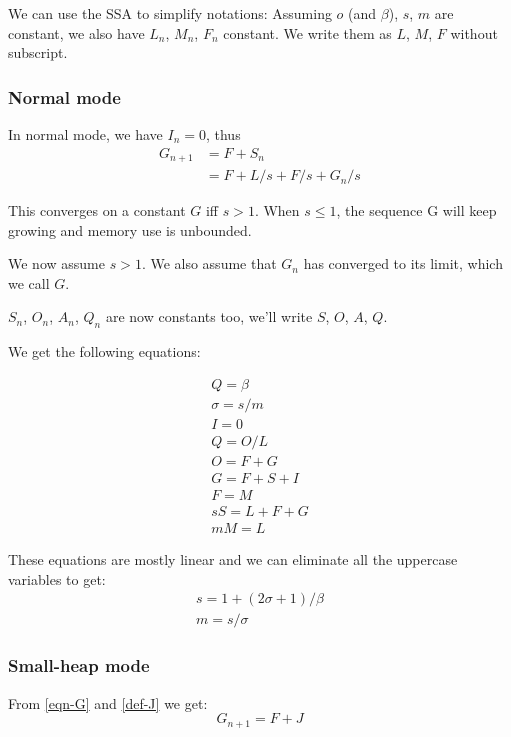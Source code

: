 \documentclass{article}
\begin{document}
We can use the SSA to simplify notations: Assuming $o$ (and $\beta$),
$s$, $m$ are constant, we also have $L_n$, $M_n$, $F_n$ constant. We
write them as $L$, $M$, $F$ without subscript.

\subsubsection{Normal mode}

In normal mode, we have $I_n = 0$, thus
\begin{equation}
\begin{split}
G_{n+1} & = F + S_n \\
        & = F + L/s + F/s + G_n/s
\end{split}
\end{equation}

This converges on a constant $G$ iff $s > 1$. When $s \leq 1$, the
sequence G will keep growing and memory use is unbounded.

We now assume $s > 1$. We also assume that $G_n$ has converged to its
limit, which we call $G$.

$S_n$, $O_n$, $A_n$, $Q_n$ are now constants too, we'll write $S$,
$O$, $A$, $Q$.

We get the following equations:

\begin{gather*}
Q = \beta      \\
\sigma = s/m   \\
I = 0          \\
Q = O / L      \\
O = F + G      \\
G = F + S + I  \\
F = M          \\
sS = L + F + G \\
mM = L
\end{gather*}

These equations are mostly linear and we can eliminate all the
uppercase variables to get:
\begin{gather*}
s = 1 + (2\sigma + 1)/\beta \\
m = s/\sigma
\end{gather*}

\subsubsection{Small-heap mode}
From \eqref{eqn-G} and \eqref{def-J} we get:
\begin{equation}
G_{n+1} = F + J
\end{equation}
\end{document}
